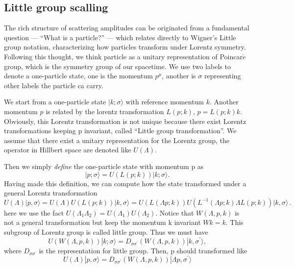 \documentclass[12pt]{article}
\numberwithin{equation}{section}
\newcommand{\aket}[1]{|#1\rangle}
\begin{document}
\subsection{Little group scalling}
The rich structure of scattering amplitudes can be originated from a fundamental question — “What is a particle?” — which relates directly to Wigner’s Little group notation,
characterizing how particles transform under Lorentz symmetry. Following this thought, we think particle as a unitary representation of 
Poincar$\acute{e}$ group, which is the symmetry group of our spacetime. We use two labels to denote a one-particle state, one is the momentum $p^\mu$, another is $\sigma$ representing
other labels the particle ca carry. 

We start from a one-particle state $\aket{k;\sigma}$ with reference momentum $k$. Another momentum $p$ is related by the lorentz transformation $L(p;k)$, $p=L(p;k)k$. Obviously, this Lorentz transformation is
not unique because there exist Lorentz transformations keeping p invariant, called ``Little group transformation''.  We assume that there exist a 
unitary representation for the Lorentz group, the operator in Hillbert space are denoted like $U(\Lambda)$. 

Then we simply \textit{define} the one-particle state with momentum p as 
\begin{equation}
    \aket{p;\sigma}=U(L(p;k))\aket{k;\sigma}.
\end{equation}
Having made this definition, we can compute how the state transformed under a general Lorentz transformation
\begin{equation}
    U(\Lambda)|p,\sigma\rangle = U(\Lambda) U(L(p;k))|k,\sigma \rangle = U(L(\Lambda p;k)) U(L^{-1}(\Lambda p;k) \Lambda L(p;k)) |k,\sigma \rangle\,.
\end{equation}
here we use the fact $U(\Lambda_1\Lambda_2)=U(\Lambda_1)U(\Lambda_2)$.
Notice that $W(\Lambda,p,k)$ is not a general transformation but keep the momentum k invariant $Wk=k$. This subgroup of Lorentz group is called little group.
Thus we must have 
\begin{equation}
    U(W(\Lambda,p,k))\aket{k;\sigma}=D_{\sigma\sigma^{'}}(W(\Lambda,p,k))\aket{k,\sigma^{'}},
\end{equation} 
where $D_{\sigma\sigma^{'}}$ is the representation for little group. Then, p should transformed like
\begin{equation}
     U(\Lambda)|p,\sigma\rangle=D_{\sigma\sigma^{'}}(W(\Lambda,p,k))\aket{\Lambda p,\sigma^{'}}
\end{equation}
\end{document}
